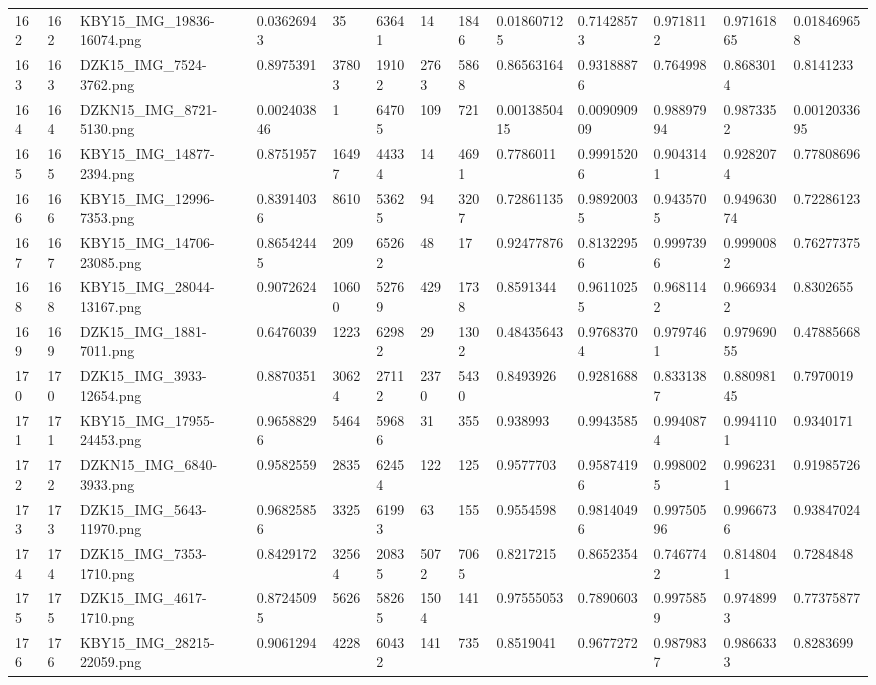 \documentclass[11pt, a4paper, twoside]{report}
\begin{document}
\begin{longtable}[c]{@{}lllllllllllll@{}}
162 & 162 & KBY15\_IMG\_19836-16074.png & 0.03626943 & 35 & 63641 & 14 & 1846 & 0.018607125 & 0.71428573 & 0.9718112 & 0.97161865 & 0.018469658 \\
163 & 163 & DZK15\_IMG\_7524-3762.png & 0.8975391 & 37803 & 19102 & 2763 & 5868 & 0.86563164 & 0.93188876 & 0.764998 & 0.8683014 & 0.8141233 \\
164 & 164 & DZKN15\_IMG\_8721-5130.png & 0.002403846 & 1 & 64705 & 109 & 721 & 0.0013850415 & 0.009090909 & 0.98897994 & 0.9873352 & 0.0012033695 \\
165 & 165 & KBY15\_IMG\_14877-2394.png & 0.8751957 & 16497 & 44334 & 14 & 4691 & 0.7786011 & 0.99915206 & 0.9043141 & 0.9282074 & 0.77808696 \\
166 & 166 & KBY15\_IMG\_12996-7353.png & 0.83914036 & 8610 & 53625 & 94 & 3207 & 0.72861135 & 0.98920035 & 0.9435705 & 0.94963074 & 0.72286123 \\
167 & 167 & KBY15\_IMG\_14706-23085.png & 0.86542445 & 209 & 65262 & 48 & 17 & 0.92477876 & 0.81322956 & 0.9997396 & 0.9990082 & 0.76277375 \\
168 & 168 & KBY15\_IMG\_28044-13167.png & 0.9072624 & 10600 & 52769 & 429 & 1738 & 0.8591344 & 0.96110255 & 0.9681142 & 0.9669342 & 0.8302655 \\
169 & 169 & DZK15\_IMG\_1881-7011.png & 0.6476039 & 1223 & 62982 & 29 & 1302 & 0.48435643 & 0.97683704 & 0.9797461 & 0.97969055 & 0.47885668 \\
170 & 170 & DZK15\_IMG\_3933-12654.png & 0.8870351 & 30624 & 27112 & 2370 & 5430 & 0.8493926 & 0.9281688 & 0.8331387 & 0.88098145 & 0.7970019 \\
171 & 171 & KBY15\_IMG\_17955-24453.png & 0.96588296 & 5464 & 59686 & 31 & 355 & 0.938993 & 0.9943585 & 0.9940874 & 0.9941101 & 0.9340171 \\
172 & 172 & DZKN15\_IMG\_6840-3933.png & 0.9582559 & 2835 & 62454 & 122 & 125 & 0.9577703 & 0.95874196 & 0.9980025 & 0.9962311 & 0.91985726 \\
173 & 173 & DZK15\_IMG\_5643-11970.png & 0.96825856 & 3325 & 61993 & 63 & 155 & 0.9554598 & 0.98140496 & 0.99750596 & 0.9966736 & 0.93847024 \\
174 & 174 & DZK15\_IMG\_7353-1710.png & 0.8429172 & 32564 & 20835 & 5072 & 7065 & 0.8217215 & 0.8652354 & 0.7467742 & 0.8148041 & 0.7284848 \\
175 & 175 & DZK15\_IMG\_4617-1710.png & 0.87245095 & 5626 & 58265 & 1504 & 141 & 0.97555053 & 0.7890603 & 0.9975859 & 0.9748993 & 0.77375877 \\
176 & 176 & KBY15\_IMG\_28215-22059.png & 0.9061294 & 4228 & 60432 & 141 & 735 & 0.8519041 & 0.9677272 & 0.9879837 & 0.9866333 & 0.8283699 \\

\end{longtable}
\end{document}
